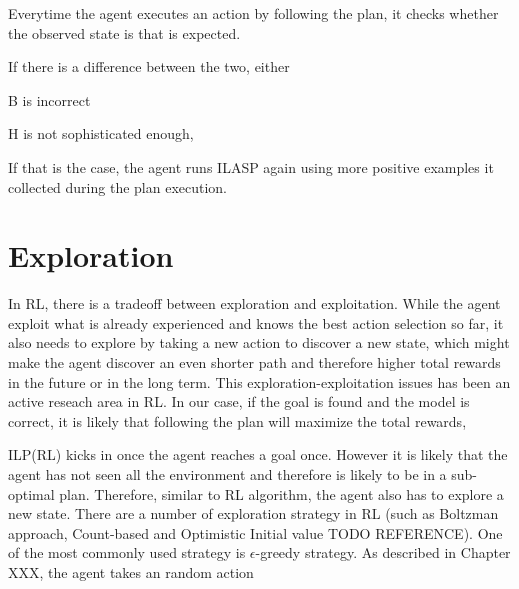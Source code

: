 

Everytime the agent executes an action by following the plan, it checks whether the observed state is that is expected.

If there is a difference between the two, either

B is incorrect

H is not sophisticated enough,

If that is the case, the agent runs ILASP again using more positive examples it collected during the plan execution.

\section{Exploration}
\label{exploration}

In RL, there is a tradeoff between exploration and exploitation. While the agent exploit what is already experienced and knows the best action selection so far, 
it also needs to explore by taking a new action to discover a new state, which might make the agent discover an even shorter path and therefore higher total rewards in the future or in the long term. 
This exploration-exploitation issues has been an active reseach area in RL. 
In our case, if the goal is found and the model is correct, it is likely that following the plan will maximize the total rewards, 

ILP(RL) kicks in once the agent reaches a goal once. However it is likely that the agent has not seen all the environment
and therefore is likely to be in a sub-optimal plan. Therefore, similar to RL algorithm, the agent also has to explore a new state.
There are a number of exploration strategy in RL (such as Boltzman approach, Count-based and Optimistic Initial value TODO REFERENCE).
One of the most commonly used strategy is $\epsilon$-greedy strategy. As described in Chapter XXX, the agent takes an random action

